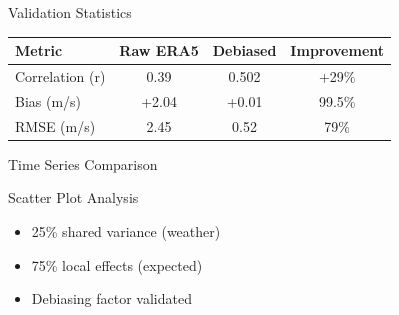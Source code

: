 \documentclass[10pt]{beamer}
\begin{document}
\begin{frame}{Validation Statistics}
\begin{table}
\centering
\begin{tabular}{lccc}
\hline
\textbf{Metric} & \textbf{Raw ERA5} & \textbf{Debiased} & \textbf{Improvement} \\
\hline
Correlation (r) & 0.39 & \alert{0.502} & +29\% \\
Bias (m/s) & +2.04 & \alert{+0.01} & 99.5\% \\
RMSE (m/s) & 2.45 & \alert{0.52} & 79\% \\
\hline
\end{tabular}
\end{table}

\begin{center}
\color{success}{\Large Validation PASSED!}
\end{center}
\end{frame}

\begin{frame}{Time Series Comparison}
\begin{center}
\end{center}
\end{frame}

\begin{frame}{Scatter Plot Analysis}
\begin{center}
\end{center}

\begin{itemize}
    \item 25\% shared variance (weather)
    \item 75\% local effects (expected)
    \item Debiasing factor validated
\end{itemize}
\end{frame}
\end{document}
